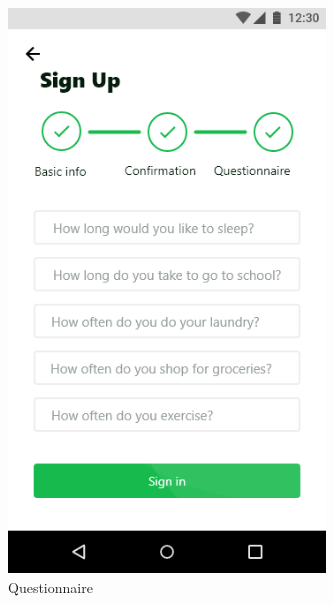 \documentclass[a4paper,11pt]{article} %
\begin{document}
\begin{figure}[h!]
  \centering
  \includegraphics[width=0.75\textwidth]{img/ui-wireframe/Sign-up-questionnaire.png}
  \caption{Questionnaire}
\end{figure}
\newpage
\end{document}
